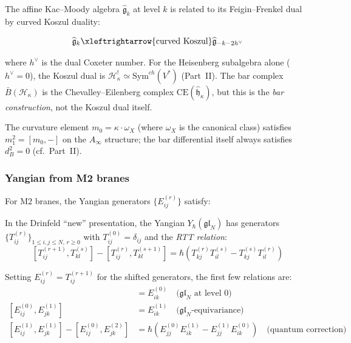 \begin{example}
The affine Kac--Moody algebra $\widehat{\mathfrak{g}}_k$ at level $k$ is related to its Feigin--Frenkel dual by curved Koszul duality:

\[\widehat{\mathfrak{g}}_k \xleftrightarrow{\text{curved Koszul}} \widehat{\mathfrak{g}}_{-k-2h^\vee}\]

where $h^\vee$ is the dual Coxeter number. For the Heisenberg subalgebra alone ($h^\vee = 0$), the Koszul dual is $\mathcal{H}_\kappa^! \simeq \mathrm{Sym}^{ch}(V^*)$ (Part~II).  The bar complex $\bar{B}(\mathcal{H}_\kappa)$ is the Chevalley--Eilenberg complex $\mathrm{CE}(\hat{\mathfrak{h}}_\kappa)$, but this is the \emph{bar construction}, not the Koszul dual itself.

The curvature element $m_0 = \kappa \cdot \omega_X$ (where $\omega_X$ is the canonical class) satisfies $m_1^2 = [m_0, -]$ on the $A_\infty$ structure; the bar differential itself always satisfies $d_B^2 = 0$ (cf.\ Part~II).
\end{example}

\subsubsection{Yangian from M2 branes}

\begin{calculation}
For M2 branes, the Yangian generators $\{E_{ij}^{(r)}\}$ satisfy:

In the Drinfeld ``new'' presentation, the Yangian $Y_\hbar(\mathfrak{gl}_N)$ has generators $\{T_{ij}^{(r)}\}_{1 \leq i,j \leq N,\, r \geq 0}$ with $T_{ij}^{(0)} = \delta_{ij}$ and the \emph{RTT relation}:
\[[T_{ij}^{(r+1)}, T_{kl}^{(s)}] - [T_{ij}^{(r)}, T_{kl}^{(s+1)}] = \hbar\left(T_{kj}^{(r)} T_{il}^{(s)} - T_{kj}^{(s)} T_{il}^{(r)}\right)\]

Setting $E_{ij}^{(r)} = T_{ij}^{(r+1)}$ for the shifted generators, the first few relations are:
\begin{align}
[E_{ij}^{(0)}, E_{jk}^{(0)}] &= E_{ik}^{(0)} \quad \text{($\mathfrak{gl}_N$ at level 0)}\\
[E_{ij}^{(0)}, E_{jk}^{(1)}] &= E_{ik}^{(1)} \quad \text{($\mathfrak{gl}_N$-equivariance)}\\
[E_{ij}^{(1)}, E_{jk}^{(1)}] - [E_{ij}^{(0)}, E_{jk}^{(2)}] &= \hbar\left(E_{jj}^{(0)} E_{ik}^{(1)} - E_{jj}^{(1)} E_{ik}^{(0)}\right) \quad \text{(quantum correction)}
\end{align}
\end{calculation}

